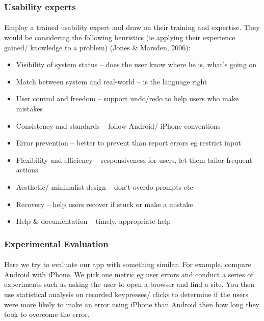 \documentclass[12pt, a4paper, twoside]{book}
\begin{document}
\subsubsection{Usability experts}
\paragraph{} Employ a trained usability expert and draw on their training and expertise. They would be considering the following heuristics (ie applying their experience gained/ knowledge to a problem) (Jones \& Marsden, 2006):

\begin{itemize}
\item Visibility of system status – does the user know where he is, what’s going on
\item Match between system and real-world – is the language right
\item User control and freedom – support undo/redo to help users who make mistakes
\item Consistency and standards – follow Android/ iPhone conventions
\item Error prevention – better to prevent than report errors eg restrict input
\item Flexibility and efficiency – responsiveness for users, let them tailor frequent actions
\item Aesthetic/ minimalist design – don’t overdo prompts etc
\item Recovery – help users recover if stuck or make a mistake
\item Help \& documentation – timely, appropriate help
\end{itemize}

\subsubsection{Experimental Evaluation}
\paragraph{} Here we try to evaluate our app with something similar. For example, compare Android  with iPhone. We pick one metric eg user errors and conduct a series of experiments such as asking the user to open a browser and find a site. You then use statistical analysis on recorded keypresses/ clicks to determine if the users were more likely to make an error using iPhone than Android then how long they took to overcome the error. 
\end{document}
